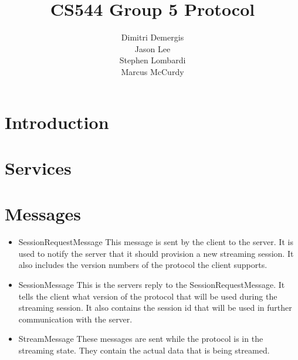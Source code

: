 \documentclass[12pt,letterpaper,titlepage]{article}
\author{Dimitri Demergis \\ Jason Lee \\ Stephen Lombardi \\ Marcus McCurdy}
\title{CS544 Group 5 Protocol}
\begin{document}
\maketitle

\section{Introduction}

\section{Services}

\section{Messages}
\begin{itemize}
\item SessionRequestMessage This message is sent by the client to the server. It is used to notify the server that it should provision a new streaming session. It also includes
the version numbers of the protocol the client supports.
\item SessionMessage This is the servers reply to the SessionRequestMessage. It tells the client what version of the protocol that will be used during the streaming session. It
also contains the session id that will be used in further communication with the server.
\item StreamMessage These messages are sent while the protocol is in the streaming state. They contain the actual data that is being streamed.
\end{itemize}
\end{document}
